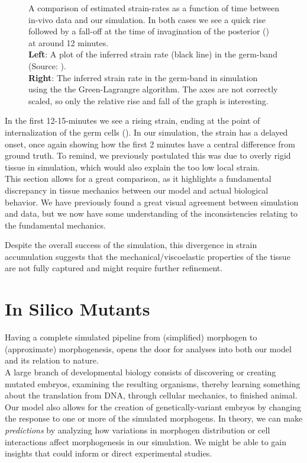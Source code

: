 \begin{figure}[H]
\begin{subfigure}{0.45\linewidth}
    \end{subfigure}
    \caption{A comparison of estimated strain-rates as a function of time between in-vivo data and our simulation. In both cases we see a quick rise followed by a fall-off at the time of invagination of the posterior () at around 12 minutes. \\\textbf{Left}: A plot of the inferred strain rate (black line) in the germ-band (Source: ). \\\textbf{Right}: The inferred strain rate in the germ-band in simulation using the the Green-Lagrangre algorithm. The axes are not correctly scaled, so only the relative rise and fall of the graph is interesting.\\
   }
    \label{fig:strain}
\end{figure}

In the first 12-15-minutes we see a rising strain, ending at the point of internalization of the germ cells (). In our simulation, the strain has a delayed onset, once again showing how the first 2 minutes have a central difference from ground truth. To remind, we previously postulated this was due to overly rigid tissue in simulation, which would also explain the too low local strain. \\

This section allows for a great comparison, as it highlights a fundamental discrepancy in tissue mechanics between our model and actual biological behavior. We have previously found a great visual agreement between simulation and data, but we now have some understanding of the inconsistencies relating to the fundamental mechanics. 

Despite the overall success of the simulation, this divergence in strain accumulation suggests that the mechanical/viscoelastic properties of the tissue are not fully captured and might require further refinement. 



\newpage
\section{In Silico Mutants}
Having a complete simulated pipeline from (simplified) morphogen to (approximate) morphogenesis, opens the door for analyses into both our model and its relation to nature. \\


A large branch of developmental biology consists of discovering or creating mutated embryos, examining the resulting organisms, thereby learning something about the translation from DNA, through cellular mechanics, to finished animal.\cite{gilmour2017morphogen}
Our model also allows for the creation of genetically-variant embryos by changing the response to one or more of the simulated morphogens. In theory, we can make \textit{predictions} by analyzing how variations in morphogen distribution or cell interactions affect morphogenesis in our simulation. We might be able to gain insights that could inform or direct experimental studies.\\

